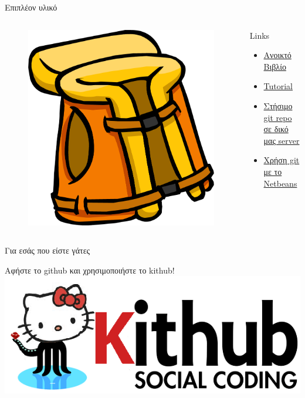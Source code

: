 \documentclass{beamer}
\begin{document}
\begin{frame}{Επιπλέον υλικό}
\begin{columns}
    \begin{figure}
      \includegraphics[scale=0.1]{lifejacket.png}
    \end{figure}
    \begin{block}{Links}
      \begin{itemize}
	\item  \href{http://git-scm.com/book}{Ανοικτό Βιβλίο}
	\item \href{http://try.github.io/levels/1/challenges/1}{Tutorial}
	\item \href{http://git-scm.com/book/ch4-2.html}{Στήσιμο git repo σε δικό μας server}
	\item \href{https://netbeans.org/kb/docs/ide/git.html}{Χρήση git με το Netbeans}
      \end{itemize}
    \end{block}
\end{columns}
\end{frame}

\begin{frame}{Για εσάς που είστε γάτες}
 \begin{center}
    Αφήστε το github και χρησιμοποιήστε το kithub! \\
    \includegraphics[scale=0.45]{kithub.png}
  \end{center}
\end{frame}
\end{document}
